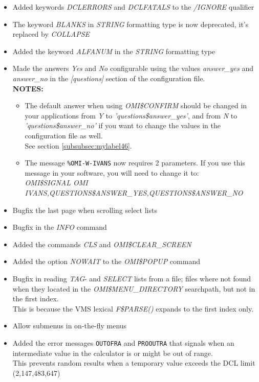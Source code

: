 \documentclass[a4paper]{book}
\begin{document}
\begin{itemize}
\item Added keywords \textsl{DCLERRORS} and \textsl{DCLFATALS} to the \textsl{/IGNORE} qualifier
\item The keyword \textsl{BLANKS} in \textsl{STRING} formatting type is now deprecated, it's replaced by \textsl{COLLAPSE}
\item Added the keyword \textsl{ALFANUM} in the \textsl{STRING} formatting type
\item Made the answers \textsl{Yes} and \textsl{No} configurable using the values \textsl{answer{\_}yes} and \textsl{answer{\_}no} in the \textsl{[questions]} section of the configuration file.\\
\textbf{NOTES:}
\begin{itemize}
\item The default answer when using \textsl{OMI{\$}CONFIRM} should be changed in your applications from \textsl{Y} to \textsl{'questions{\$}answer{\_}yes'}, and from \textsl{N} to \textsl{'questions{\$}answer{\_}no'} if you want to change the values in the configuration file as well.\\
See section \ref{subsubsec:mylabel46}.
\item The message \texttt{\%OMI-W-IVANS} now requires 2 parameters. If you use this message in your software, you will need to change it to:\\
\textsl{OMI{\$}SIGNAL OMI IVANS,QUESTIONS{\$}ANSWER{\_}YES,QUESTIONS{\$}ANSWER{\_}NO}
\end{itemize}
\item Bugfix the last page when scrolling select lists
\item Bugfix in the \textsl{INFO} command
\item Added the commands \textsl{CLS} and \textsl{OMI{\$}CLEAR{\_}SCREEN}
\item Added the option \textsl{NOWAIT} to the \textsl{OMI{\$}POPUP} command
\item Bugfix in reading \textsl{TAG}- and \textsl{SELECT} lists from a file; files where not found when they located in the \textsl{OMI{\$}MENU{\_}DIRECTORY} searchpath, but not in the first index.\\
This is because the VMS lexical \textsl{F{\$}PARSE()} expands to the first index only.
\item Allow submenus in on-the-fly menus
\item Added the error messages \texttt{OUTOFRA} and \texttt{PROOUTRA} that signals when an intermediate value in the calculator is or might be out of range.\\
This prevents random results when a temporary value exceeds the DCL limit (2,147,483,647)
\end{itemize}
\end{document}
